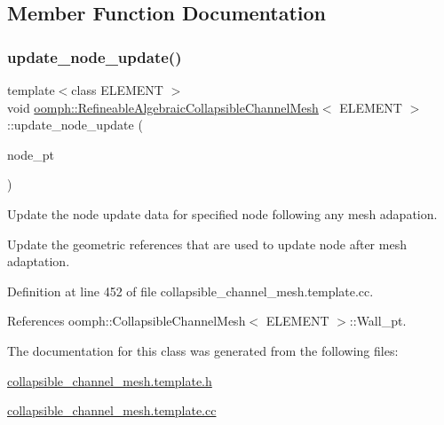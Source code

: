 \subsection{Member Function Documentation}
\mbox{\label{classoomph_1_1RefineableAlgebraicCollapsibleChannelMesh_a4bc2b99f24e5e5dc534fe5906d4f4e6e}} 
\subsubsection{\texorpdfstring{update\+\_\+node\+\_\+update()}{update\_node\_update()}}
{\footnotesize\ttfamily template$<$class E\+L\+E\+M\+E\+NT $>$ \\
void \hyperlink{classoomph_1_1RefineableAlgebraicCollapsibleChannelMesh}{oomph\+::\+Refineable\+Algebraic\+Collapsible\+Channel\+Mesh}$<$ E\+L\+E\+M\+E\+NT $>$\+::update\+\_\+node\+\_\+update (\begin{DoxyParamCaption}\item[{Algebraic\+Node $\ast$\&}]{node\+\_\+pt }\end{DoxyParamCaption})}



Update the node update data for specified node following any mesh adapation. 

Update the geometric references that are used to update node after mesh adaptation. 

Definition at line 452 of file collapsible\+\_\+channel\+\_\+mesh.\+template.\+cc.



References oomph\+::\+Collapsible\+Channel\+Mesh$<$ E\+L\+E\+M\+E\+N\+T $>$\+::\+Wall\+\_\+pt.



The documentation for this class was generated from the following files\+:\begin{DoxyCompactItemize}
\item 
\hyperlink{collapsible__channel__mesh_8template_8h}{collapsible\+\_\+channel\+\_\+mesh.\+template.\+h}\item 
\hyperlink{collapsible__channel__mesh_8template_8cc}{collapsible\+\_\+channel\+\_\+mesh.\+template.\+cc}\end{DoxyCompactItemize}
